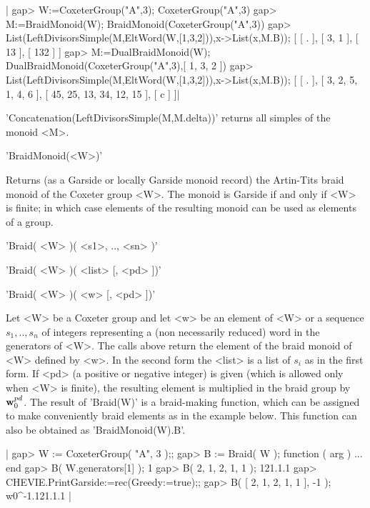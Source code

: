 |    gap> W:=CoxeterGroup("A",3);
    CoxeterGroup("A",3)
    gap> M:=BraidMonoid(W);
    BraidMonoid(CoxeterGroup("A",3))
    gap> List(LeftDivisorsSimple(M,EltWord(W,[1,3,2])),x->List(x,M.B));
    [ [ . ], [ 3, 1 ], [ 13 ], [ 132 ] ]
    gap> M:=DualBraidMonoid(W);
    DualBraidMonoid(CoxeterGroup("A",3),[ 1, 3, 2 ])
    gap> List(LeftDivisorsSimple(M,EltWord(W,[1,3,2])),x->List(x,M.B));
    [ [ . ], [ 3, 2, 5, 1, 4, 6 ], [ 45, 25, 13, 34, 12, 15 ], [ c ] ]|

'Concatenation(LeftDivisorsSimple(M,M.delta))'  returns all  simples of the
monoid <M>.


'BraidMonoid(<W>)'

Returns (as a  Garside or locally Garside monoid  record) the Artin-Tits
braid monoid of the Coxeter group <W>. The monoid is Garside if and only
if <W> is finite; in which case  elements of the resulting monoid can be
used as elements of a group.


'Braid( <W> )( <s1>, .., <sn> )'

'Braid( <W> )( <list> [, <pd> ])'

'Braid( <W> )( <w> [, <pd> ])'

Let  <W> be a Coxeter group and let <w>  be an element of <W> or a sequence
$s_1,..,s_n$  of integers representing a  (non necessarily reduced) word in
the  generators of  <W>. The  calls above  return the  element of the braid
monoid  of <W> defined by <w>.  In the second form the  <list> is a list of
$s_i$  as in the  first form. If  <pd> (a positive  or negative integer) is
given  (which is allowed only when <W> is finite), the resulting element is
multiplied  in the braid group by ${\bf w}_0^{pd}$. The result of 'Braid(W)' is
a  braid-making function, which can be  assigned to make conveniently braid
elements  as in the  example below. This  function can also  be obtained as
'BraidMonoid(W).B'.

|    gap> W := CoxeterGroup( "A", 3 );;
    gap> B := Braid( W );
    function ( arg ) ... end
    gap> B( W.generators[1] );
    1
    gap> B( 2, 1, 2, 1, 1 );
    121.1.1
    gap> CHEVIE.PrintGarside:=rec(Greedy:=true);;
    gap> B( [ 2, 1, 2, 1, 1 ], -1 );
    w0^-1.121.1.1 |

